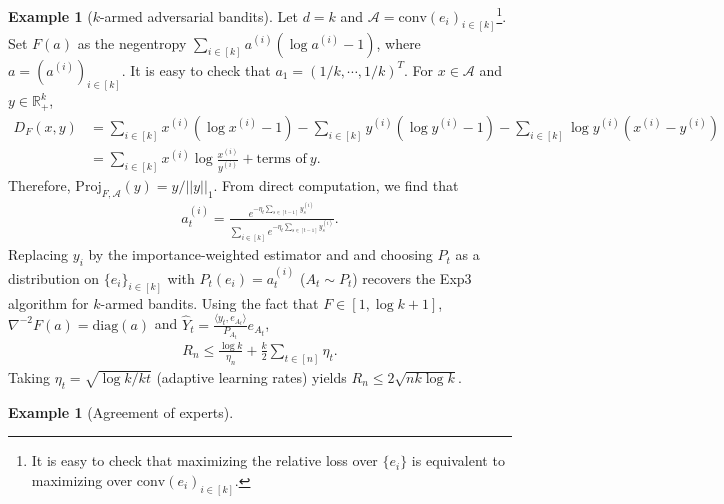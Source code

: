\documentclass[10pt,a4article]{article}
\numberwithin{equation}{section}
\theoremstyle{plain}
\theoremstyle{definition}
\newtheorem{Ex}[Th]{Example}
\def\R{{\mathbb R}}
\def\R{{\mathbb R}}
\begin{document}
\begin{Ex}[$k$-armed adversarial bandits]\label{al:ex1}
Let $d=k$ and $\mathcal A = \text{conv}(e_i)_{i\in [k]}$\footnote{It is easy to check that maximizing the relative loss over $\{e_i\}$ is equivalent to maximizing over $\text{conv}(e_i)_{i\in [k]}$.}. Set $F(a)$ as the negentropy $\sum_{i\in [k]}a^{(i)}(\log a^{(i)}-1)$, where $a=(a^{(i)})_{i\in [k]}$. It is easy to check that $a_1=(1/k, \cdots, 1/k)^T$. For $x\in\mathcal A$ and $y\in\R_+^k$, 
\begin{align*}
D_F(x,y) &= \sum_{i\in [k]}x^{(i)}(\log x^{(i)}-1)-\sum_{i\in [k]}y^{(i)}(\log y^{(i)}-1)-\sum_{i\in [k]}\log y^{(i)}(x^{(i)}-y^{(i)})\\
& = \sum_{i\in [k]}x^{(i)}\log \frac{x^{(i)}}{y^{(i)}}+\text{terms of}\ y.
\end{align*}
Therefore, $\text{Proj}_{F, \mathcal A}(y) = y/||y||_1$. From direct computation, we find that
\begin{align}
a_t^{(i)} = \frac{e^{-\eta_t\sum_{s\in [t-1]} y_s^{(i)}}}{\sum_{i\in [k]}e^{-\eta_t\sum_{s\in [t-1]} y_s^{(i)}}}. \label{al:5}
\end{align}
Replacing $y_i$ by the importance-weighted estimator and and choosing $P_t$ as a distribution on $\{e_i\}_{i\in [k]}$ with $P_t(e_i)=a_t^{(i)}$ ($A_t\sim P_t$) recovers the Exp3 algorithm for $k$-armed bandits. 
Using the fact that $F\in [1,\log k+1] $, $\nabla^{-2} F(a) = \text{diag}(a)$ and $\hat{Y}_t=\frac{\langle y_t, e_{A_t}\rangle}{P_{A_t}}e_{A_t}$,
\begin{align*}
R_n\leq\frac{\log k}{\eta_n}+\frac{k}{2}\sum_{t\in [n]}\eta_t.
\end{align*}
Taking $\eta_t = \sqrt{\log k/kt}$ (adaptive learning rates) yields $R_n\leq 2\sqrt{nk\log k}$.
\end{Ex}


\begin{Ex}[Agreement of experts]\label{expert}


\end{Ex}
\end{document}
